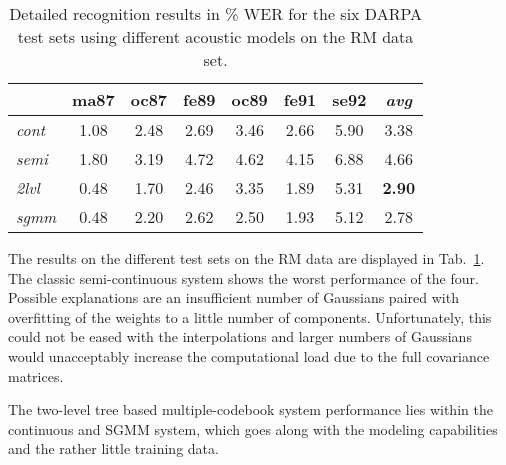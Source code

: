 \documentclass{article}
\begin{document}
\begin{table}%
\begin{center}
\begin{tabular}{|l||c|c|c|c|c|c||c|}
\hline
~               & ma87 & oc87 & fe89 & oc89 & fe91 & se92 & {\em avg}  \\ \hline\hline
{\em cont} &  1.08 &  2.48 &  2.69 &  3.46 &  2.66 &  5.90 & 3.38 \\ \hline
{\em semi} &  1.80 &  3.19 &  4.72 &  4.62 &  4.15 &  6.88 & 4.66 \\ \hline 
{\em 2lvl} &  0.48 &  1.70 &  2.46 &  3.35 &  1.89 &  5.31 & {\bf 2.90} \\ \hline
{\em sgmm} &  0.48 &  2.20 &  2.62 &  2.50 &  1.93 &  5.12 & 2.78 \\ \hline
\end{tabular}
\end{center}
\caption{\label{tab:res_rm}
Detailed recognition results in \% WER for the six DARPA test sets using 
different acoustic models on the RM data set.
}
\end{table}

The results on the different test sets on the RM data are displayed in 
Tab.~\ref{tab:res_rm}. The classic semi-continuous system shows the worst 
performance of the four. Possible explanations are an insufficient number
of Gaussians paired with overfitting of the weights to a little number of 
components. Unfortunately, this could not be eased with the interpolations
and larger numbers of Gaussians would unacceptably increase the computational 
load due to the full covariance matrices.

The two-level tree based multiple-codebook system performance lies within the 
continuous and SGMM system, which goes along with the modeling capabilities 
and the rather little training data. 

\end{document}
